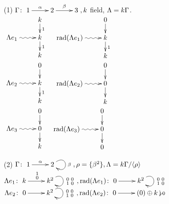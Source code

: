\begin{exam}
\begin{enumerate}
\item[(1)] $\G \colon \xymatrix{1 \ar[r]^\alpha & 2\ar[r]^\beta & 3 }, k$ field, $\Lambda = k\Gamma$.\\
$\xymatrix@R-1pc{
&k\ar[d]^1\\
\Lambda e_1 \ar@{~>}[r]&k\ar[d]^1\\
&k
}
\;\;\;\; 
\xymatrix@R-1pc{
&0\ar[d]\\
\rad (\Lambda e_1) \ar@{~>}[r]&k\ar[d]^1\\
&k
}$
\\
$\xymatrix@R-1pc{
&0\ar[d]\\
\Lambda e_2 \ar@{~>}[r]&k\ar[d]^1\\
&k
}
\;\;\;\; 
\xymatrix@R-1pc{
&0\ar[d]\\
\rad (\Lambda e_2) \ar@{~>}[r]&0\ar[d]\\
&k
}$\\
$\xymatrix@R-1pc{
&0\ar[d]\\
\Lambda e_3 \ar@{~>}[r]&0\ar[d]\\
&k
}
\;\;\;\; 
\xymatrix@R-1pc{
&0\ar[d]\\
\rad (\Lambda e_3) \ar@{~>}[r]&0\ar[d]\\
&0
}$

\item[(2)] $\G \colon \xymatrix{1 \ar[r]^\alpha & 2 \ar@(ur, dr)^\beta}, \rho = \{ \beta^2 \}, \Lambda = k\G / \langle \rho \rangle$\\
$\Lambda e_1 \colon \xymatrix{k \ar[r]^{\begin{smallmatrix} 1\\0 \end{smallmatrix}}  & k^2 \ar@(ur, dr)^{\begin{smallmatrix} 0&0\\1&0 \end{smallmatrix}}}, \rad (\Lambda e_1) \colon \xymatrix{0 \ar[r] & k^2 \ar@(ur, dr)^{\begin{smallmatrix} 0&0\\1&0 \end{smallmatrix}}}$\\
$\Lambda e_2 \colon \xymatrix{0 \ar[r]  & k^2 \ar@(ur, dr)^{\begin{smallmatrix} 0&0\\1&0 \end{smallmatrix}}}, \rad (\Lambda e_2) \colon \xymatrix{0 \ar[r] & (0) \oplus k \ar@(ur, dr)^0}$\\
\end{enumerate}
\end{exam}

